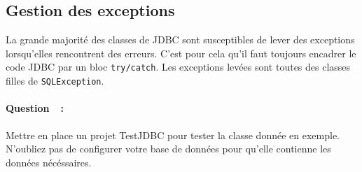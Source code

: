 \documentclass{article}
\newcounter{compteurQuestion}
\newcommand{\Question}{\paragraph*{Question~\thecompteurQuestion~:}\addtocounter{compteurQuestion}{1}}%
\begin{document}
\subsection{Gestion des exceptions}
La grande majorité des classes de JDBC sont susceptibles de lever des exceptions lorsqu'elles rencontrent des erreurs. C'est pour cela qu'il faut toujours encadrer le code JDBC par un bloc \texttt{try/catch}. Les exceptions levées sont toutes des classes filles de \texttt{SQLException}.

\Question Mettre en place un projet TestJDBC pour tester la classe donnée en exemple. N'oubliez pas de configurer votre base de données pour qu'elle contienne les données nécéssaires.
\end{document}
